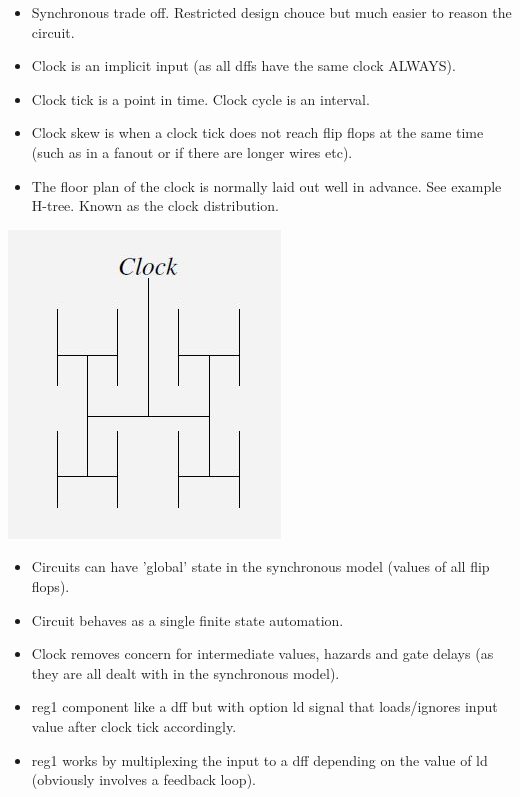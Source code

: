 \documentclass{article}
\begin{document}
\begin{itemize}
\item Synchronous trade off. Restricted design chouce but much easier to reason the circuit.
\item Clock is an implicit input (as all dffs have the same clock ALWAYS).
\item Clock tick is a point in time. Clock cycle is an interval.
\item Clock skew is when a clock tick does not reach flip flops at the same time (such as in a fanout or if there are longer wires etc). 
\item The floor plan of the clock is normally laid out well in advance. See example H-tree. Known as the clock distribution.
\end{itemize}
\begin{center}
\includegraphics[width=0.5\linewidth]{hlayout}
\end{center}
\begin{itemize}
\item Circuits can have 'global' state in the synchronous model (values of all flip flops).
\item Circuit behaves as a single finite state automation.
\item Clock removes concern for intermediate values, hazards and gate delays (as they are all dealt with in the synchronous model).
\item reg1 component like a dff but with option ld signal that loads/ignores input value after clock tick accordingly.
\item reg1 works by multiplexing the input to a dff depending on the value of ld (obviously involves a feedback loop).
\end{itemize}
\end{document}
